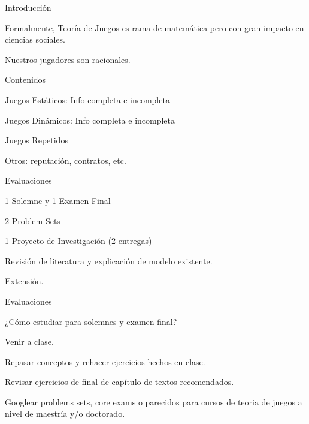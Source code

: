\documentclass[notes, 11pt]{beamer} %
\newenvironment{wideitemize}{\itemize\addtolength{\itemsep}{10pt}}{\enditemize}
\begin{document}
\begin{frame}{Introducci\'on}
	\begin{wideitemize}
		\item<1-> Formalmente, Teor\'ia de Juegos es rama de matem\'atica pero con gran impacto en ciencias sociales.
		\item<2-> Nuestros jugadores son racionales.
	\end{wideitemize}
\end{frame}
\fi

\begin{frame}{Contenidos}
	\begin{wideitemize}
		\item<1-> Juegos Est\'aticos: Info completa e incompleta
		\item<2-> Juegos Din\'amicos: Info completa e incompleta
		\item<3-> Juegos Repetidos
		\item<4-> Otros: reputaci\'on, contratos, etc.
	\end{wideitemize}
\end{frame}

\begin{frame}{Evaluaciones}
	\begin{wideitemize}
		\item<1-> 1 Solemne y 1 Examen Final
		\item<2-> 2 Problem Sets
		\item<3-> 1 Proyecto de Investigaci\'on (2 entregas)
		\begin{wideitemize}
			\item<4->[--] Revisi\'on de literatura y explicaci\'on de modelo existente.
			\item<5->[--] Extensi\'on.
		\end{wideitemize}
	\end{wideitemize}
\end{frame}

\begin{frame}{Evaluaciones}
	\begin{wideitemize}
		\item<1-> ¿C\'omo estudiar para solemnes y examen final?
		\begin{wideitemize}
			\item<2->[--] Venir a clase.
			\item<3->[--] Repasar conceptos y rehacer ejercicios hechos en clase.
			\item<4->[--] Revisar ejercicios de final de cap\'itulo de textos recomendados.
			\item<5->[--] Googlear problems sets, core exams o parecidos para cursos de teoria de juegos a nivel de maestr\'ia y/o doctorado.
		\end{wideitemize}
	\end{wideitemize}
\end{frame}



\begin{frame}
\maketitle
\end{frame}
\end{document}
